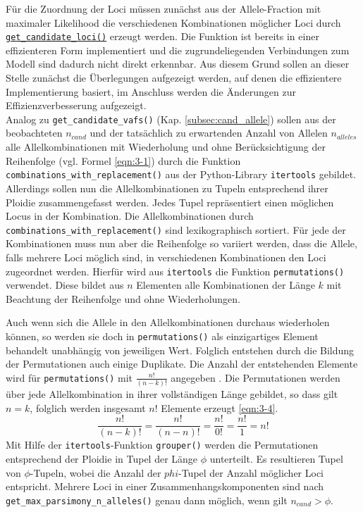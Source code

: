Für die Zuordnung der Loci müssen zunächst aus der Allele-Fraction mit maximaler Likelihood die  verschiedenen Kombinationen möglicher Loci durch \hyperref[schritt13]{\lstinline|get_candidate_loci()|\label{schritt13txt}} erzeugt werden. Die Funktion ist bereits in einer effizienteren Form implementiert und die zugrundeliegenden Verbindungen zum Modell sind dadurch nicht direkt erkennbar. Aus diesem Grund sollen an dieser Stelle zunächst die Überlegungen aufgezeigt werden, auf denen die effizientere Implementierung basiert, im Anschluss werden die Änderungen zur Effizienzverbesserung aufgezeigt. \\

Analog zu \lstinline|get_candidate_vafs()| (Kap. \ref{subsec:cand_allele}) sollen aus der beobachteten $n_{cand} $ und der tatsächlich zu erwartenden Anzahl von Allelen $n_{alleles}$ alle Allelkombinationen mit Wiederholung und ohne Berücksichtigung der Reihenfolge  (vgl. Formel \eqref{eqn:3-1}) durch die Funktion \lstinline|combinations_with_replacement()| aus der Python-Library \lstinline|itertools| gebildet. Allerdings sollen nun die Allelkombinationen zu Tupeln entsprechend ihrer Ploidie zusammengefasst werden. Jedes Tupel repräsentiert einen möglichen Locus in der Kombination. Die Allelkombinationen durch \lstinline|combinations_with_replacement()| sind lexikographisch sortiert. Für jede der Kombinationen muss nun aber die Reihenfolge so variiert werden, dass die Allele, falls mehrere Loci möglich sind, in verschiedenen Kombinationen den Loci zugeordnet werden. Hierfür wird aus \lstinline|itertools| die Funktion \lstinline|permutations()| verwendet. Diese bildet aus $ n $ Elementen alle Kombinationen der Länge $ k $ mit Beachtung der Reihenfolge und ohne Wiederholungen.

Auch wenn sich die Allele in den Allelkombinationen durchaus wiederholen können, so werden sie doch in \lstinline|permutations()| als einzigartiges Element behandelt unabhängig von jeweiligen Wert. Folglich entstehen durch die Bildung der Permutationen auch einige Duplikate. Die Anzahl der entstehenden Elemente wird für \lstinline|permutations()| mit  $ \frac{n!}{(n-k)!} $ angegeben \cite{itertools}. Die Permutationen werden über jede Allelkombination in ihrer vollständigen Länge gebildet, so dass gilt $ n = k $, folglich werden insgesamt $ n! $ Elemente erzeugt \eqref{eqn:3-4}. 
\begin{equation} \label{eqn:3-4}
\tag{3-4}
\frac{n!}{(n-k)!}=\frac{n!}{(n-n)!}=\frac{n!}{0!}=\frac{n!}{1}=n!
\end{equation}
Mit Hilfe der \lstinline|itertools|-Funktion \lstinline|grouper()| werden die Permutationen entsprechend der Ploidie in Tupel der Länge $\phi$ unterteilt. Es resultieren Tupel von $ \phi $-Tupeln, wobei die Anzahl der $phi$-Tupel der Anzahl möglicher Loci entspricht. Mehrere Loci in einer Zusammenhangskomponenten sind nach \lstinline|get_max_parsimony_n_alleles()| genau dann möglich, wenn gilt $n_{cand} > \phi $.\\

